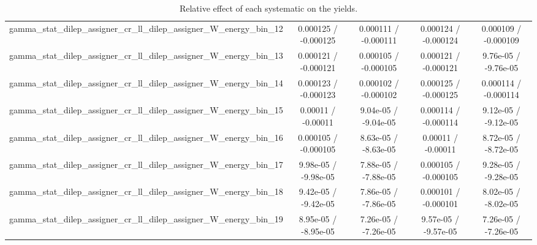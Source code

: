 \documentclass[10pt]{article}
\begin{document}
\begin{table}[htbp]
\begin{center}
\begin{tabular}{|c|c|c|c|c|}
  gamma_stat_dilep_assigner_cr_ll_dilep_assigner_W_energy_bin_12 & 0.000125 / -0.000125 & 0.000111 / -0.000111 & 0.000124 / -0.000124 & 0.000109 / -0.000109 \\ 
  gamma_stat_dilep_assigner_cr_ll_dilep_assigner_W_energy_bin_13 & 0.000121 / -0.000121 & 0.000105 / -0.000105 & 0.000121 / -0.000121 & 9.76e-05 / -9.76e-05 \\ 
  gamma_stat_dilep_assigner_cr_ll_dilep_assigner_W_energy_bin_14 & 0.000123 / -0.000123 & 0.000102 / -0.000102 & 0.000125 / -0.000125 & 0.000114 / -0.000114 \\ 
  gamma_stat_dilep_assigner_cr_ll_dilep_assigner_W_energy_bin_15 & 0.00011 / -0.00011 & 9.04e-05 / -9.04e-05 & 0.000114 / -0.000114 & 9.12e-05 / -9.12e-05 \\ 
  gamma_stat_dilep_assigner_cr_ll_dilep_assigner_W_energy_bin_16 & 0.000105 / -0.000105 & 8.63e-05 / -8.63e-05 & 0.00011 / -0.00011 & 8.72e-05 / -8.72e-05 \\ 
  gamma_stat_dilep_assigner_cr_ll_dilep_assigner_W_energy_bin_17 & 9.98e-05 / -9.98e-05 & 7.88e-05 / -7.88e-05 & 0.000105 / -0.000105 & 9.28e-05 / -9.28e-05 \\ 
  gamma_stat_dilep_assigner_cr_ll_dilep_assigner_W_energy_bin_18 & 9.42e-05 / -9.42e-05 & 7.86e-05 / -7.86e-05 & 0.000101 / -0.000101 & 8.02e-05 / -8.02e-05 \\ 
  gamma_stat_dilep_assigner_cr_ll_dilep_assigner_W_energy_bin_19 & 8.95e-05 / -8.95e-05 & 7.26e-05 / -7.26e-05 & 9.57e-05 / -9.57e-05 & 7.26e-05 / -7.26e-05 \\ 
\hline 
\end{tabular} 
\caption{Relative effect of each systematic on the yields.} 
\end{center} 
\end{table} 
\end{document}
